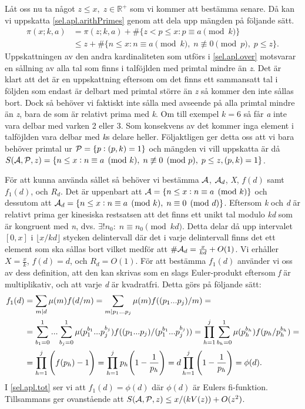 Låt oss nu ta något \(z\leq x,\; z \in \mathbb{R}^+\) som vi kommer att bestämma senare. Då kan vi uppskatta \eqref{sel.apl.arithPrimes} genom att dela upp mängden på följande sätt.
\begin{align}
    \pi(x;k,a) &= \pi(z;k,a) + \#\{z<p\leq x: p \equiv a \pmod{k}\} \nonumber\\
    &\leq z + \#\{n\leq x: n \equiv a \pmod k,\; n \not\equiv 0 \pmod p,\; p\leq z\}.\label{sel.apl.over}
\end{align}
Uppskattningen av den andra kardinaliteten som utförs i \eqref{sel.apl.over} motsvarar en sållning av alla tal som finns i talföjlden med primtal mindre än \textit{z}. 
Det är klart att det är en uppskattning eftersom om det finns ett sammansatt tal i följden som endast är delbart med primtal större än \textit{z} så kommer den inte sållas bort. 
Dock så behöver vi faktiskt inte sålla med avseende på alla primtal mindre än \textit{z}, bara de som är relativt prima med \textit{k}. 
Om till exempel \(k = 6\) så får \textit{a} inte vara delbar med varken 2 eller 3.
Som konsekvens av det kommer inga element i talföjlden vara delbar med \textit{k}s delare heller.
Följaktligen ger detta oss att vi bara behöver primtal ur \(\P = \{p: (p, k) = 1\}\) och mängden vi vill uppskatta är då \(\S{A}{P}{z} = \{n\leq x: n \equiv a \pmod k,\; n \not\equiv 0 \pmod p,\; p\leq z, (p,k) = 1\}\).

För att kunna använda sållet så behöver vi bestämma \(\A\), \(\A_d\), \textit{X}, \(f(d)\) samt \(f_1(d)\), och \(R_d\). 
Det är uppenbart att \(\A = \{n\leq x: n \equiv a \pmod k\}\) och dessutom att \(\A_d = \{n \leq x: n \equiv a \pmod k,\; n \equiv 0 \pmod d\}\). 
Eftersom \textit{k} och \textit{d} är relativt prima ger kinesiska restsatsen att det finns ett unikt tal modulo \textit{kd} som är kongruent med \textit{n}, dvs. \(\exists! n_0:\; n \equiv n_0 \pmod{kd}\). 
Detta delar då upp intervalet \([0, x]\) i \(\lfloor x/{kd}\rfloor\) stycken delintervall där det i varje delintervall finns det ett element som ska sållas bort vilket medför att \(\#\A_d = \frac{x}{kd} + O(1)\). 
Vi erhåller \(X = \frac{x}{k}\), \(f(d) = d\), och \(R_d = O(1)\). 
För att bestämma \(f_1(d)\) använder vi oss av dess definition, att den kan skrivas som en slags Euler-produkt eftersom \textit{f} är multiplikativ, och att varje \textit{d} är kvadratfri. 
Detta görs på följande sätt:
\begin{align}
    f_1(d) &= \sum_{m\divides d}\mu(m)f(d/m) = \sum_{m\divides p_1...p_j}\mu(m)f((p_1...p_j)/m) = \nonumber\\
    &=\sum_{b_1 = 0}^1...\sum_{b_j = 0}^1\mu(p_1^{b_1}...p_j^{b_j})f((p_1...p_j)/(p_1^{b_1}...p_j^{b_j})) = \prod_{h = 1}^j\sum_{b_h = 0}^1\mu(p_h^{b_h})f(p_h/p_h^{b_h}) = \nonumber\\
    &= \prod_{h = 1}^j\Bigg(f(p_h) - 1\Bigg) = \prod_{h = 1}^j p_h\Bigg(1 - \frac{1}{p_h}\Bigg) = d\prod_{h = 1}^j \Bigg(1 - \frac{1}{p_h}\Bigg) = \phi(d).\label{sel.apl.tot}
\end{align}
I \eqref{sel.apl.tot} ser vi att \(f_1(d) = \phi(d)\) där \(\phi(d)\) är Eulers fi-funktion. 
Tillsammans ger ovanstående att \(\S{A}{P}{z} \leq x/(kV(z)) + O(z^2)\). 

